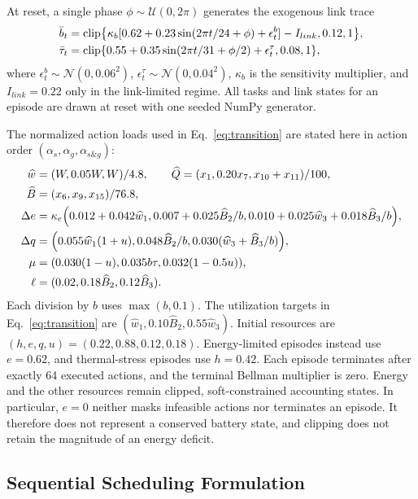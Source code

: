 \documentclass[remotesensing,article,submit,moreauthors]{Definitions/mdpi}
\DeclareMathOperator{\clip}{clip}
\begin{document}
At reset, a single phase $\phi\sim\mathcal U(0,2\pi)$ generates the exogenous link trace
\begin{align}
\bar b_t&=\clip\left\{\kappa_b[0.62+0.23\sin(2\pi t/24+\phi)+\epsilon^b_t]-I_{link},0.12,1\right\},\notag\\
\bar\tau_t&=\clip\left\{0.55+0.35\sin(2\pi t/31+\phi/2)+\epsilon^\tau_t,0.08,1\right\},
\label{eq:link_trace}
\end{align}
where $\epsilon^b_t\sim\mathcal N(0,0.06^2)$, $\epsilon^\tau_t\sim\mathcal N(0,0.04^2)$, $\kappa_b$ is the sensitivity multiplier, and $I_{link}=0.22$ only in the link-limited regime. All tasks and link states for an episode are drawn at reset with one seeded NumPy generator.

The normalized action loads used in Eq.~\eqref{eq:transition} are stated here in action order $(\alpha_s,\alpha_g,\alpha_{s\&g})$:
\begin{align}
\widehat w&=(W,0.05W,W)/4.8,\qquad
\widehat Q=(x_1,0.20x_7,x_{10}+x_{11})/100,\notag\\
\widehat B&=(x_6,x_9,x_{15})/76.8,\notag\\
\Delta e&=\kappa_e\left(0.012+0.042\widehat w_1,
0.007+0.025\widehat B_2/b,
0.010+0.025\widehat w_3+0.018\widehat B_3/b\right),\notag\\
\Delta q&=\left(0.055\widehat w_1(1+u),
0.048\widehat B_2/b,
0.030(\widehat w_3+\widehat B_3/b)\right),\notag\\
\mu&=\left(0.030(1-u),0.035b\tau,0.032(1-0.5u)\right),\notag\\
\ell&=(0.02,0.18\widehat B_2,0.12\widehat B_3).
\label{eq:action_loads}
\end{align}
Each division by $b$ uses $\max(b,0.1)$. The utilization targets in Eq.~\eqref{eq:transition} are $(\widehat w_1,0.10\widehat B_2,0.55\widehat w_3)$. Initial resources are $(h,e,q,u)=(0.22,0.88,0.12,0.18)$. Energy-limited episodes instead use $e=0.62$, and thermal-stress episodes use $h=0.42$. Each episode terminates after exactly 64 executed actions, and the terminal Bellman multiplier is zero. Energy and the other resources remain clipped, soft-constrained accounting states. In particular, $e=0$ neither masks infeasible actions nor terminates an episode. It therefore does not represent a conserved battery state, and clipping does not retain the magnitude of an energy deficit.

\subsection{Sequential Scheduling Formulation}
\label{sec:mdp}
\end{document}
